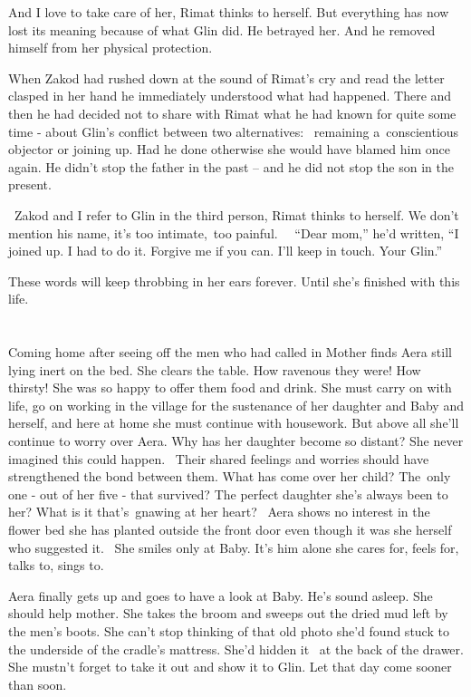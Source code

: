 \documentclass[twoside,11pt]{book}
\begin{document}
And I love to take care of her, Rimat thinks to herself. But everything has now lost its meaning because of what Glin
did. He betrayed her. And he removed himself from her physical protection.

When{ }Zakod had rushed down at the sound of Rimat's cry and read the letter clasped in her hand he
immediately understood what had happened. There and then he had decided{ }not to share with Rimat what
he had known for quite some time - about Glin's conflict between two alternatives: ~remaining a~conscientious objector
or joining up. Had he done otherwise she would have blamed him once again. He didn't stop the father in the past -- and
he did not stop the son in the present.

~Zakod and I refer to Glin in the third person, Rimat thinks to herself. We don't mention his name, it's too
intimate,~too painful. \ \ ``Dear mom,'' he'd written, ``I joined up. I had to do it. Forgive me if you
can. I'll keep in touch. Your Glin.''

These words will keep throbbing in her ears forever. Until she's finished with this life.


\bigskip

\chapter{}

Coming home after seeing off the men who had called in Mother finds Aera still lying inert on the bed. She clears the
table. How ravenous they were! How thirsty! She was so happy to offer them food and drink. She must carry on with life,
go on working in the village for the sustenance of her daughter and Baby\textbf{ }and herself, and here at home she
must continue with housework.{ }But above all she'll continue to worry over Aera. Why has her daughter
become so distant? She never imagined this could happen. ~Their shared feelings and worries should have strengthened
the bond between them. What has come over her child? The~only one - out of her five - that survived? The perfect
daughter she's always been to her? What is it that's~gnawing at her heart? ~Aera shows no interest in the flower bed
she has planted outside the front door even though it was she herself who suggested it. ~She smiles only at Baby. It's
him alone she cares for, feels for, talks to, sings to.

Aera finally gets up and goes to have a look at Baby. He's sound asleep. She should help mother. She takes the broom and
sweeps out the dried mud left by the men's boots. She can't stop thinking of that old photo she'd found stuck
to{ }the underside of the cradle's mattress. She'd hidden it \ at the back of the drawer. She mustn't
forget to take it out and show it to Glin. Let that day come sooner than soon.
\end{document}
